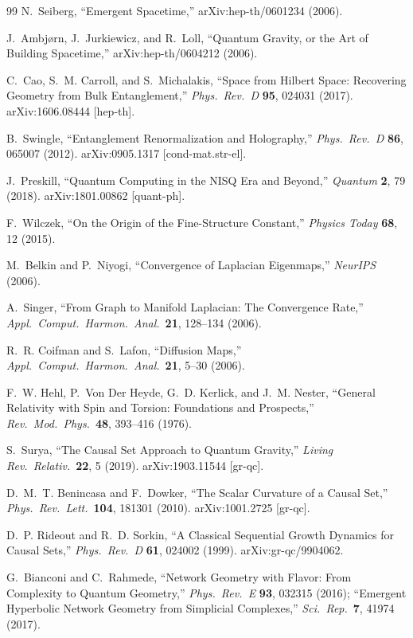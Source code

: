 \documentclass[11pt,a4paper]{article}
\theoremstyle{plain}
\theoremstyle{definition}
\begin{document}
\begin{thebibliography}{99}
N.~Seiberg, ``Emergent Spacetime,'' arXiv:hep-th/0601234 (2006).

J.~Ambj\o rn, J.~Jurkiewicz, and R.~Loll, ``Quantum Gravity, or the Art of Building Spacetime,'' arXiv:hep-th/0604212 (2006).

C.~Cao, S.~M. Carroll, and S.~Michalakis, ``Space from Hilbert Space: Recovering Geometry from Bulk Entanglement,'' \textit{Phys.\ Rev.\ D} \textbf{95}, 024031 (2017). arXiv:1606.08444 [hep-th].

B.~Swingle, ``Entanglement Renormalization and Holography,'' \textit{Phys.\ Rev.\ D} \textbf{86}, 065007 (2012). arXiv:0905.1317 [cond-mat.str-el].

J.~Preskill, ``Quantum Computing in the NISQ Era and Beyond,'' \textit{Quantum} \textbf{2}, 79 (2018). arXiv:1801.00862 [quant-ph].

F.~Wilczek, ``On the Origin of the Fine-Structure Constant,'' \textit{Physics Today} \textbf{68}, 12 (2015).

M.~Belkin and P.~Niyogi, ``Convergence of Laplacian Eigenmaps,'' \textit{NeurIPS} (2006).

A.~Singer, ``From Graph to Manifold Laplacian: The Convergence Rate,'' \textit{Appl.\ Comput.\ Harmon.\ Anal.}\ \textbf{21}, 128--134 (2006).

R.~R. Coifman and S.~Lafon, ``Diffusion Maps,'' \textit{Appl.\ Comput.\ Harmon.\ Anal.}\ \textbf{21}, 5--30 (2006).

F.~W. Hehl, P.~Von Der Heyde, G.~D. Kerlick, and J.~M. Nester, ``General Relativity with Spin and Torsion: Foundations and Prospects,'' \textit{Rev.\ Mod.\ Phys.}\ \textbf{48}, 393--416 (1976).

S.~Surya, ``The Causal Set Approach to Quantum Gravity,'' \textit{Living Rev.\ Relativ.}\ \textbf{22}, 5 (2019). arXiv:1903.11544 [gr-qc].

D.~M.~T. Benincasa and F.~Dowker, ``The Scalar Curvature of a Causal Set,'' \textit{Phys.\ Rev.\ Lett.}\ \textbf{104}, 181301 (2010). arXiv:1001.2725 [gr-qc].

D.~P. Rideout and R.~D. Sorkin, ``A Classical Sequential Growth Dynamics for Causal Sets,'' \textit{Phys.\ Rev.\ D} \textbf{61}, 024002 (1999). arXiv:gr-qc/9904062.

G.~Bianconi and C.~Rahmede, ``Network Geometry with Flavor: From Complexity to Quantum Geometry,'' \textit{Phys.\ Rev.\ E} \textbf{93}, 032315 (2016); ``Emergent Hyperbolic Network Geometry from Simplicial Complexes,'' \textit{Sci.\ Rep.}\ \textbf{7}, 41974 (2017).


\end{thebibliography}
\end{document}
